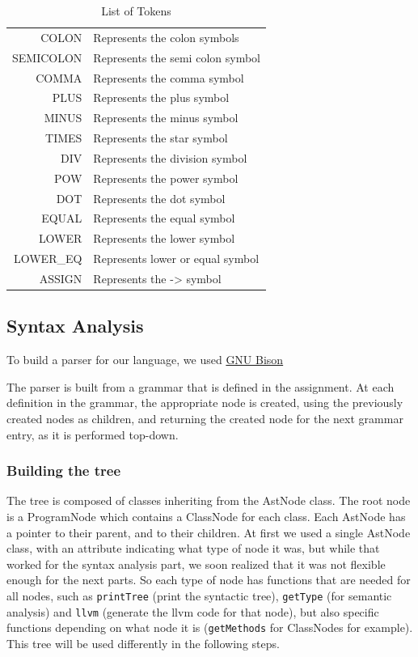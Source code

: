 \documentclass[a4paper,11pt]{article}
\begin{document}
\begin{table}[hp]
\begin{tabular}{|r|p{10cm}|}
      COLON & Represents the colon symbols\\
      SEMICOLON & Represents the semi colon symbol\\
      COMMA & Represents the comma symbol\\
      PLUS & Represents the plus symbol\\
      MINUS & Represents the minus symbol\\
      TIMES & Represents the star symbol\\
      DIV & Represents the division symbol\\
      POW & Represents the power symbol\\
      DOT & Represents the dot symbol\\
      EQUAL & Represents the equal symbol\\
      LOWER & Represents the lower symbol\\
      LOWER\_EQ & Represents lower or equal symbol\\
      ASSIGN & Represents the -> symbol\\
      \hline
      \end{tabular}
      \caption{List of Tokens\label{tab:listToken}}
    \end{table}

\subsection{Syntax Analysis}
  \label{sec:syntax}
  To build a parser for our language, we used \href{https://www.gnu.org/software/bison/}{GNU Bison} 

  The parser is built from a grammar that is defined in the assignment. At each definition in the grammar, the appropriate node is created, using the previously created nodes as children, and returning the created node for the next grammar entry, as it is performed top-down.

  \subsubsection{Building the tree}
    \label{sec:tree}
    The tree is composed of classes inheriting from the AstNode class. The root node is a ProgramNode which contains a ClassNode for each class. 
	Each AstNode has a pointer to their parent, and to their children. At first we used a single AstNode class, with an attribute indicating what type of node it was, but while that worked for the syntax analysis part, we soon realized that it was not flexible enough for the next parts. So each type of node has functions that are needed for all nodes, such as \texttt{printTree} (print the syntactic tree), \texttt{getType} (for semantic analysis) and \texttt{llvm} (generate the llvm code for that node), but also specific functions depending on what node it is (\texttt{getMethods} for ClassNodes for example).\\
	This tree will be used differently in the following steps.
\end{document}
